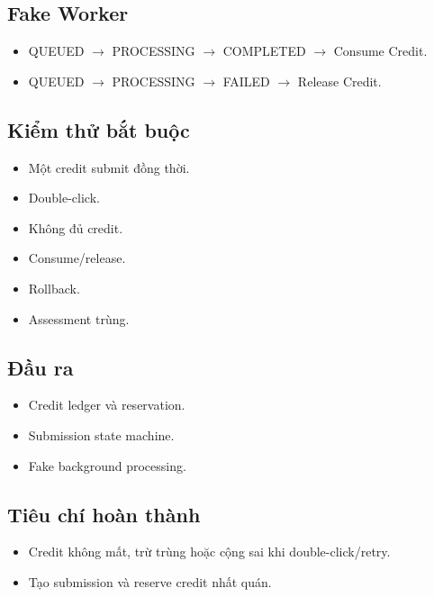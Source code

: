 \documentclass[
  11pt,
  a4paper,
]{article}
\begin{document}
\subsection{Fake Worker}\label{fake-worker}

\begin{itemize}
\item
  QUEUED \(\rightarrow\) PROCESSING \(\rightarrow\) COMPLETED \(\rightarrow\) Consume Credit.
\item
  QUEUED \(\rightarrow\) PROCESSING \(\rightarrow\) FAILED \(\rightarrow\) Release Credit.
\end{itemize}

\subsection{Kiểm thử bắt
buộc}\label{kiux1ec3m-thux1eed-bux1eaft-buux1ed9c-3}

\begin{itemize}
\item
  Một credit submit đồng thời.
\item
  Double-click.
\item
  Không đủ credit.
\item
  Consume/release.
\item
  Rollback.
\item
  Assessment trùng.
\end{itemize}

\subsection{Đầu ra}\label{ux111ux1ea7u-ra-5}

\begin{itemize}
\item
  Credit ledger và reservation.
\item
  Submission state machine.
\item
  Fake background processing.
\end{itemize}

\subsection{Tiêu chí hoàn
thành}\label{tiuxeau-chuxed-houxe0n-thuxe0nh-5}

\begin{itemize}
\item
  Credit không mất, trừ trùng hoặc cộng sai khi double-click/retry.
\item
  Tạo submission và reserve credit nhất quán.
\end{itemize}
\end{document}
